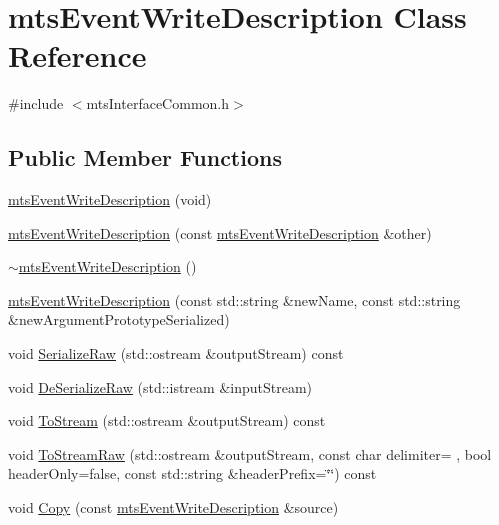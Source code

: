 \hypertarget{classmts_event_write_description}{}\section{mts\+Event\+Write\+Description Class Reference}
\label{classmts_event_write_description}


{\ttfamily \#include $<$mts\+Interface\+Common.\+h$>$}

\subsection*{Public Member Functions}
\begin{DoxyCompactItemize}
\item 
\hyperlink{classmts_event_write_description_afb89c432bdb881025f980a2651ec53ba}{mts\+Event\+Write\+Description} (void)
\item 
\hyperlink{classmts_event_write_description_a3afd3122cd5913a0c1b063b89b9f766e}{mts\+Event\+Write\+Description} (const \hyperlink{classmts_event_write_description}{mts\+Event\+Write\+Description} \&other)
\item 
\hyperlink{classmts_event_write_description_a24a2677653fcc90e97a5f694804f8925}{$\sim$mts\+Event\+Write\+Description} ()
\item 
\hyperlink{classmts_event_write_description_a7875c6c14b753057ff8570f194bf4884}{mts\+Event\+Write\+Description} (const std\+::string \&new\+Name, const std\+::string \&new\+Argument\+Prototype\+Serialized)
\item 
void \hyperlink{classmts_event_write_description_ab026bd26ff75c7db87b6dc2a2b7b01fa}{Serialize\+Raw} (std\+::ostream \&output\+Stream) const 
\item 
void \hyperlink{classmts_event_write_description_a21f614b0a8657771b6240edb7cac40c4}{De\+Serialize\+Raw} (std\+::istream \&input\+Stream)
\item 
void \hyperlink{classmts_event_write_description_adf6aa527fc192f04e57e88e3a328f7fe}{To\+Stream} (std\+::ostream \&output\+Stream) const 
\item 
void \hyperlink{classmts_event_write_description_a7d673b2ed51d07b597a50d2f6c8a1bfc}{To\+Stream\+Raw} (std\+::ostream \&output\+Stream, const char delimiter= \textquotesingle{} \textquotesingle{}, bool header\+Only=false, const std\+::string \&header\+Prefix=\char`\"{}\char`\"{}) const 
\item 
void \hyperlink{classmts_event_write_description_a8e24b958a99dc75fceb4c8d6213da890}{Copy} (const \hyperlink{classmts_event_write_description}{mts\+Event\+Write\+Description} \&source)

\end{DoxyCompactItemize}
